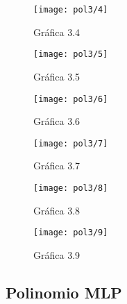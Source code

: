 \documentclass[6pt]{article}
\begin{document}
\begin{figure}[htpb]
	\centering
	\texttt{[image: pol3/4]}
	\caption{Gráfica 3.4}
\end{figure}

\begin{figure}[htpb]
	\centering
	\texttt{[image: pol3/5]}
	\caption{Gráfica 3.5}
\end{figure}

\begin{figure}[htpb]
	\centering
	\texttt{[image: pol3/6]}
	\caption{Gráfica 3.6}
\end{figure}

\begin{figure}[htpb]
	\centering
	\texttt{[image: pol3/7]}
	\caption{Gráfica 3.7}
\end{figure}

\begin{figure}[htpb]
	\centering
	\texttt{[image: pol3/8]}
	\caption{Gráfica 3.8}
\end{figure}

\begin{figure}[htpb]
	\centering
	\texttt{[image: pol3/9]}
	\caption{Gráfica 3.9}
\end{figure}
\newpage

\subsection{Polinomio MLP}
\end{document}
